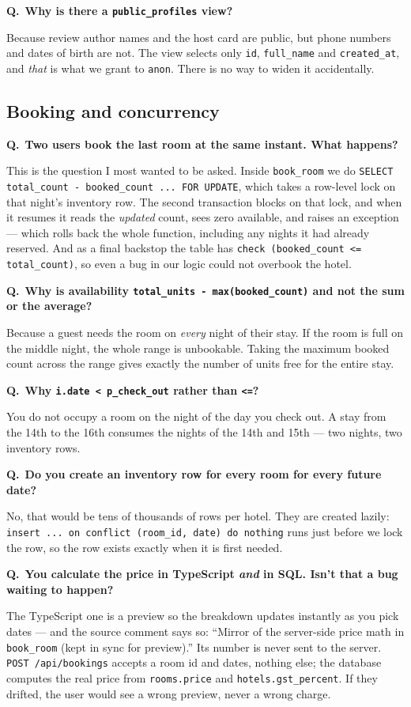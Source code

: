 \documentclass[11pt,a4paper]{article}
\newcommand{\Q}[1]{\vspace{7pt}\noindent\textbf{\color{primary}Q.}~\textbf{#1}\par\vspace{1pt}}
\newcommand{\A}[1]{\noindent #1\par}
\begin{document}
\Q{Why is there a \texttt{public\_profiles} view?}
\A{Because review author names and the host card are public, but phone numbers and
dates of birth are not. The view selects only \texttt{id}, \texttt{full\_name} and
\texttt{created\_at}, and \emph{that} is what we grant to \texttt{anon}. There is
no way to widen it accidentally.}

\subsection{Booking and concurrency}

\Q{Two users book the last room at the same instant. What happens?}
\A{This is the question I most wanted to be asked. Inside \texttt{book\_room} we do
\texttt{SELECT total\_count - booked\_count ... FOR UPDATE}, which takes a
row-level lock on that night's inventory row. The second transaction blocks on that
lock, and when it resumes it reads the \emph{updated} count, sees zero available,
and raises an exception --- which rolls back the whole function, including any
nights it had already reserved. And as a final backstop the table has
\texttt{check (booked\_count <= total\_count)}, so even a bug in our logic could
not overbook the hotel.}

\Q{Why is availability \texttt{total\_units - max(booked\_count)} and not the sum
or the average?}
\A{Because a guest needs the room on \emph{every} night of their stay. If the room
is full on the middle night, the whole range is unbookable. Taking the maximum
booked count across the range gives exactly the number of units free for the
entire stay.}

\Q{Why \texttt{i.date < p\_check\_out} rather than \texttt{<=}?}
\A{You do not occupy a room on the night of the day you check out. A stay from the
14th to the 16th consumes the nights of the 14th and 15th --- two nights, two
inventory rows.}

\Q{Do you create an inventory row for every room for every future date?}
\A{No, that would be tens of thousands of rows per hotel. They are created lazily:
\texttt{insert ... on conflict (room\_id, date) do nothing} runs just before we
lock the row, so the row exists exactly when it is first needed.}

\Q{You calculate the price in TypeScript \emph{and} in SQL. Isn't that a bug
waiting to happen?}
\A{The TypeScript one is a preview so the breakdown updates instantly as you pick
dates --- and the source comment says so: ``Mirror of the server-side price math in
\texttt{book\_room} (kept in sync for preview).'' Its number is never sent to the
server. \texttt{POST /api/bookings} accepts a room id and dates, nothing else; the
database computes the real price from \texttt{rooms.price} and
\texttt{hotels.gst\_percent}. If they drifted, the user would see a wrong preview,
never a wrong charge.}
\end{document}
